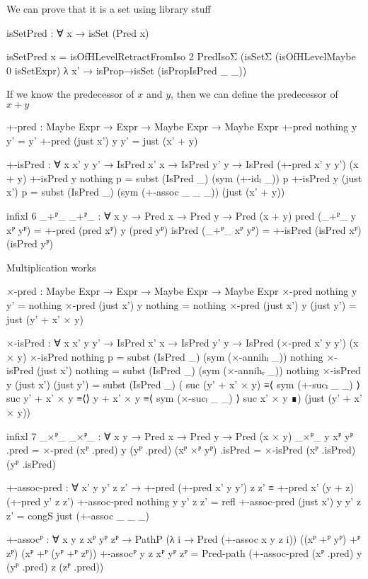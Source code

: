 We can prove that it is a set using library stuff
\begin{code}
  isSetPred : ∀ x → isSet (Pred x)
\end{code}
\begin{code}[hide]
  isSetPred x =
    isOfHLevelRetractFromIso 2 PredIsoΣ
      (isSetΣ (isOfHLevelMaybe 0 isSetExpr) λ x' →
        isProp→isSet (isPropIsPred _ _))
\end{code}
If we know the predecessor of $x$ and $y$, then we can define the predecessor of
$x + y$
\begin{code}
  +-pred :
    Maybe Expr → Expr → Maybe Expr → Maybe Expr
  +-pred nothing    y y' = y'
  +-pred (just x')  y y' = just (x' + y)

  +-isPred :
    ∀ {x x' y y'} → IsPred x' x → IsPred y' y →
    IsPred (+-pred x' y y') (x + y)
  +-isPred {y} nothing    p = subst (IsPred _) (sym (+-idₗ _)) p
  +-isPred {y} (just x')  p =
    subst (IsPred _) (sym (+-assoc _ _ _)) (just (x' + y))

  infixl 6 _+ᴾ_
  _+ᴾ_ : ∀ {x y} → Pred x → Pred y → Pred (x + y)
  pred    (_+ᴾ_ {y}  xᴾ yᴾ) = +-pred (pred xᴾ) y (pred yᴾ)
  isPred  (_+ᴾ_      xᴾ yᴾ) = +-isPred (isPred xᴾ) (isPred yᴾ)
\end{code}
Multiplication works
\begin{code}
  ×-pred :
    Maybe Expr → Expr → Maybe Expr → Maybe Expr
  ×-pred nothing    y y'         = nothing
  ×-pred (just x')  y nothing    = nothing
  ×-pred (just x')  y (just y')  = just (y' + x' × y)
\end{code}
\begin{code}[hide]
  ×-isPred :
    ∀ {x x' y y'} →
    IsPred x' x → IsPred y' y → IsPred (×-pred x' y y') (x × y)
  ×-isPred nothing p = subst (IsPred _) (sym (×-annihₗ _)) nothing
  ×-isPred (just x') nothing = subst (IsPred _) (sym (×-annihᵣ _)) nothing
  ×-isPred {y} (just x') (just y') =
    subst (IsPred _)
      ( suc (y' + x' × y) ≡⟨ sym (+-sucₗ _ _) ⟩
        suc y' + x' × y   ≡⟨⟩
        y + x' × y         ≡⟨ sym (×-sucₗ _ _) ⟩
        suc x' × y         ∎)
      (just (y' + x' × y))

  infixl 7 _×ᴾ_
  _×ᴾ_ : ∀ {x y} → Pred x → Pred y → Pred (x × y)
  _×ᴾ_ {y} xᴾ yᴾ .pred = ×-pred (xᴾ .pred) y (yᴾ .pred)
  (xᴾ ×ᴾ yᴾ) .isPred = ×-isPred (xᴾ .isPred) (yᴾ .isPred)

  +-assoc-pred :
    ∀ x' y y' z z' →
    +-pred (+-pred x' y y') z z' ≡ +-pred x' (y + z) (+-pred y' z z')
  +-assoc-pred nothing y y' z z' = refl
  +-assoc-pred (just x') y y' z z' = congS just (+-assoc _ _ _)

  +-assocᴾ :
    ∀ {x y z} xᴾ yᴾ zᴾ →
    PathP (λ i → Pred (+-assoc x y z i)) ((xᴾ +ᴾ yᴾ) +ᴾ zᴾ) (xᴾ +ᴾ (yᴾ +ᴾ zᴾ))
  +-assocᴾ {y} {z} xᴾ yᴾ zᴾ =
    Pred-path (+-assoc-pred (xᴾ .pred) y (yᴾ .pred) z (zᴾ .pred))
\end{code}
